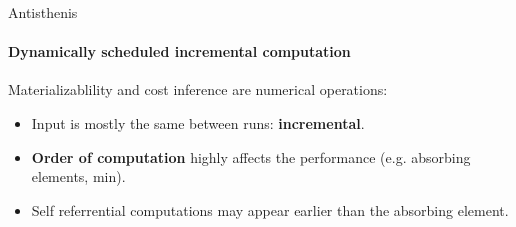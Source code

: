 \begin{frame}{Antisthenis}
  \framesubtitle{Dynamically scheduled incremental computation}

  Materializablility and cost inference are numerical operations:

  \begin{itemize}
  \item Input is mostly the same between runs: \textbf{incremental}.
  \item \textbf{Order of computation} highly affects the performance
    (e.g. absorbing elements, min).
  \item Self referrential computations may appear earlier than the
    absorbing element.
  \end{itemize}
\end{frame}


